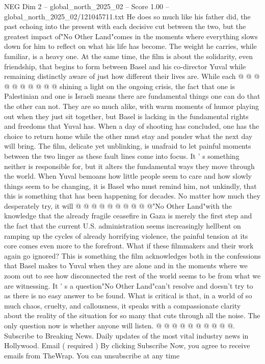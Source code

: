 \begin{textsample}{NEG Dim 2 – global\_north\_2025\_02 – Score 1.00 – global\_north\_2025\_02/121045711.txt}
He does so much like his father did, the past echoing into the present with each decisive cut between the two, but the greatest impact of"No Other Land"comes in the moments where everything slows down for him to reflect on what his life has become.
The weight he carries, while familiar, is a heavy one.
At the same time, the film is about the solidarity, even friendship, that begins to form between Basel and his co-director Yuval while remaining distinctly aware of just how different their lives are.
While each @ @ @ @ @ @ @ @ @ @ shining a light on the ongoing crisis, the fact that one is Palestinian and one is Israeli means there are fundamental things one can do that the other can not.
They are so much alike, with warm moments of humor playing out when they just sit together, but Basel is lacking in the fundamental rights and freedoms that Yuval has.
When a day of shooting has concluded, one has the choice to return home while the other must stay and ponder what the next day will bring.
The film, delicate yet unblinking, is unafraid to let painful moments between the two linger as these fault lines come into focus.
It ' s something neither is responsible for, but it alters the fundamental ways they move through the world.
When Yuval bemoans how little people seem to care and how slowly things seem to be changing, it is Basel who must remind him, not unkindly, that this is something that has been happening for decades.
No matter how much they desperately try, it will @ @ @ @ @ @ @ @ @ @"No Other Land"with the knowledge that the already fragile ceasefire in Gaza is merely the first step and the fact that the current U.S. administration seems increasingly hellbent on ramping up the cycles of already horrifying violence, the painful tension at its core comes even more to the forefront.
What if these filmmakers and their work again go ignored?
This is something the film acknowledges both in the confessions that Basel makes to Yuval when they are alone and in the moments where we zoom out to see how disconnected the rest of the world seems to be from what we are witnessing.
It ' s a question"No Other Land"can't resolve and doesn't try to as there is no easy answer to be found.
What is critical is that, in a world of so much chaos, cruelty, and callousness, it speaks with a compassionate clarity about the reality of the situation for so many that cuts through all the noise.
The only question now is whether anyone will listen. @ @ @ @ @ @ @ @ @ @.
Subscribe to Breaking News.
Daily updates of the most vital industry news in Hollywood.
Email ( required ) By clicking Subscribe Now, you agree to receive emails from TheWrap.
You can unsubscribe at any time

\end{textsample}
